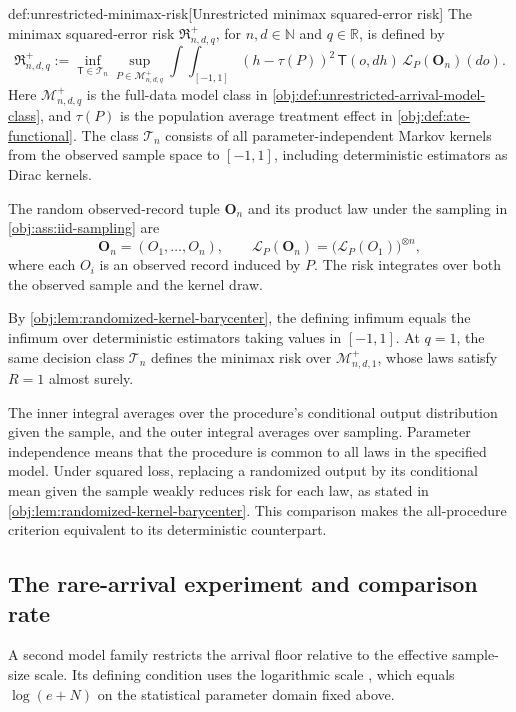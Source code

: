 \documentclass[11pt]{article}
\begin{document}
\begin{definitionv}{def:unrestricted-minimax-risk}[Unrestricted minimax squared-error risk]
The minimax squared-error risk \(\mathfrak R^{+}_{n,d,q}\), for \(n,d\in\mathbb N\) and \(q\in\mathbb R\), is defined by
\[
\mathfrak R^{+}_{n,d,q}
:=
\inf_{\mathsf T\in\mathcal T_n}
\sup_{P\in\mathcal M^{+}_{n,d,q}}
\int\!\int_{[-1,1]}
(h-\tau(P))^2\,
\mathsf T(o,dh)\,
\mathcal L_P(\mathbf O_n)(do).
\]
Here \(\mathcal M^{+}_{n,d,q}\) is the full-data model class in \cref{obj:def:unrestricted-arrival-model-class}, and \(\tau(P)\) is the population average treatment effect in \cref{obj:def:ate-functional}. The class \(\mathcal T_n\) consists of all parameter-independent Markov kernels from the observed sample space to \([-1,1]\), including deterministic estimators as Dirac kernels.

The random observed-record tuple \(\mathbf O_n\) and its product law under the sampling in \cref{obj:ass:iid-sampling} are
\[
\mathbf O_n=(O_1,\ldots,O_n),
\qquad
\mathcal L_P(\mathbf O_n)
=
\bigl(\mathcal L_P(O_1)\bigr)^{\otimes n},
\]
where each \(O_i\) is an observed record induced by \(P\). The risk integrates over both the observed sample and the kernel draw.

By \cref{obj:lem:randomized-kernel-barycenter}, the defining infimum equals the infimum over deterministic estimators taking values in \([-1,1]\). At \(q=1\), the same decision class \(\mathcal T_n\) defines the minimax risk over \(\mathcal M^{+}_{n,d,1}\), whose laws satisfy \(R=1\) almost surely.
\end{definitionv}

The inner integral averages over the procedure's conditional output distribution given the sample, and the outer integral averages over sampling. Parameter independence means that the procedure is common to all laws in the specified model. Under squared loss, replacing a randomized output by its conditional mean given the sample weakly reduces risk for each law, as stated in \cref{obj:lem:randomized-kernel-barycenter}. This comparison makes the all-procedure criterion equivalent to its deterministic counterpart.

\subsection{The rare-arrival experiment and comparison rate}

A second model family restricts the arrival floor relative to the effective sample-size scale. Its defining condition uses the logarithmic scale , which equals \(\log(e+N)\) on the statistical parameter domain fixed above.
\end{document}
